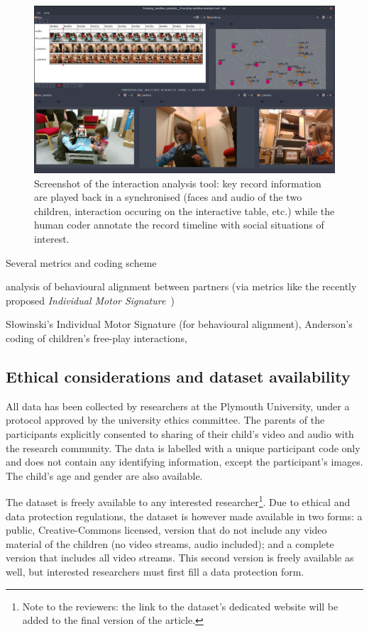 \documentclass{article}
\begin{document}
\begin{figure}
    \centering
    \includegraphics[width=0.8\linewidth]{analysis}
    \caption{Screenshot of the interaction analysis tool: key record information
    are played back in a synchronised (faces and audio of the two children,
    interaction occuring on the interactive table, etc.) while the human coder
    annotate the record timeline with social situations of interest.}
    \label{fig|analysis}
\end{figure}

Several metrics and coding scheme

analysis of behavioural alignment between partners (via
metrics like the recently proposed \emph{Individual Motor
Signature}~\cite{slowinski2016dynamic})

Słowinski’s Individual Motor Signature
(for behavioural alignment), Anderson's~\cite{anderson2004social} coding of children’s free-play
interactions,


\subsection{Ethical considerations and dataset availability}
\label{availability}

All data has been collected by researchers at the Plymouth University, under a
protocol approved by the university ethics committee. The parents of the
participants explicitly consented to sharing of their child's video and audio
with the research community. The data is labelled with a unique participant code
only and does not contain any identifying information, except the participant's
images. The child's age and gender are also available.

The dataset is freely available to any interested researcher\footnote{Note to
the reviewers: the link to the dataset's dedicated website will be added to the
final version of the article.}. Due to ethical and data protection regulations,
the dataset is however made available in two forms: a public, Creative-Commons
licensed, version that do not include any video material of the children (no
video streams, audio included); and a complete version that includes all video
streams. This second version is freely available as well, but interested
researchers must first fill a data protection form.
\end{document}
